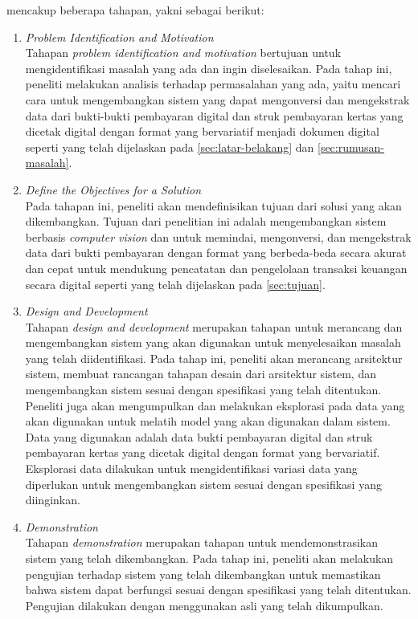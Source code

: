 \dsrm{} mencakup beberapa tahapan, yakni sebagai berikut:
\begin{enumerate}
	\item \emph{Problem Identification and Motivation}~\\
	      Tahapan \emph{problem identification and motivation} bertujuan untuk mengidentifikasi masalah yang ada dan ingin diselesaikan. Pada tahap ini, peneliti melakukan analisis terhadap permasalahan yang ada, yaitu mencari cara untuk mengembangkan sistem yang dapat mengonversi dan mengekstrak data dari bukti-bukti pembayaran digital dan struk pembayaran kertas yang dicetak digital dengan format yang bervariatif menjadi dokumen digital seperti yang telah dijelaskan pada \autoref{sec:latar-belakang} dan \autoref{sec:rumusan-masalah}.
	\item \emph{Define the Objectives for a Solution}~\\
	      Pada tahapan ini, peneliti akan mendefinisikan tujuan dari solusi yang akan dikembangkan. Tujuan dari penelitian ini adalah mengembangkan sistem berbasis \emph{computer vision} dan \dl{} untuk memindai, mengonversi, dan mengekstrak data dari bukti pembayaran dengan format yang berbeda-beda secara akurat dan cepat untuk mendukung pencatatan dan pengelolaan transaksi keuangan secara digital seperti yang telah dijelaskan pada \autoref{sec:tujuan}.
	\item \emph{Design and Development}~\\
	      Tahapan \emph{design and development} merupakan tahapan untuk merancang dan mengembangkan sistem yang akan digunakan untuk menyelesaikan masalah yang telah diidentifikasi. Pada tahap ini, peneliti akan merancang arsitektur sistem, membuat rancangan tahapan desain dari arsitektur sistem, dan mengembangkan sistem sesuai dengan spesifikasi yang telah ditentukan.	Peneliti juga akan mengumpulkan dan melakukan eksplorasi pada data yang akan digunakan untuk melatih model \dl{} yang akan digunakan dalam sistem. Data yang digunakan adalah data bukti pembayaran digital dan struk pembayaran kertas yang dicetak digital dengan format yang bervariatif. Eksplorasi data dilakukan untuk mengidentifikasi variasi data yang diperlukan untuk mengembangkan sistem sesuai dengan spesifikasi yang diinginkan.
	\item \emph{Demonstration}~\\
	      Tahapan \emph{demonstration} merupakan tahapan untuk mendemonstrasikan sistem yang telah dikembangkan. Pada tahap ini, peneliti akan melakukan pengujian terhadap sistem yang telah dikembangkan untuk memastikan bahwa sistem dapat berfungsi sesuai dengan spesifikasi yang telah ditentukan. Pengujian dilakukan dengan menggunakan \dataset{} asli yang telah dikumpulkan.

\end{enumerate}
